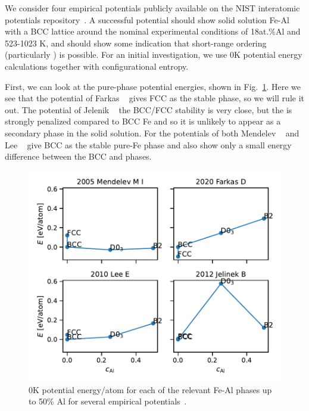 We consider four empirical potentials \cite{mendelev2005effect, lee2010modified, jelinek2012modified, farkas2020model} publicly available on the NIST interatomic potentials repository~\cite{nist}.
A successful potential should show solid solution Fe-Al with a BCC lattice around the nominal experimental conditions of 18at.\%Al and 523-1023 K, and should show some indication that short-range ordering (particularly \DOTHREE) is possible.
For an initial investigation, we use 0K potential energy calculations together with configurational entropy.

First, we can look at the pure-phase potential energies, shown in Fig.~\ref{fig:0K_phases}.
Here we see that the potential of Farkas \etal~\cite{farkas2020model} gives FCC as the stable phase, so we will rule it out.
The potential of Jelenik \etal~\cite{jelinek2012modified} the BCC/FCC stability is very close, but the \DOTHREE is strongly penalized compared to BCC Fe and so it is unlikely to appear as a secondary phase in the solid solution.
For the potentials of both Mendelev \etal~\cite{mendelev2005effect} and Lee \etal~\cite{lee2010modified} give BCC as the stable pure-Fe phase and also show only a small energy difference between the BCC and \DOTHREE phases.
%
\begin{figure}[h]
    \centering
    \includegraphics[width=\textwidth]{figures/zerok_phases}
    \caption{0K potential energy/atom for each of the relevant Fe-Al phases up to 50\% Al for several empirical potentials~\cite{mendelev2005effect, lee2010modified, jelinek2012modified, farkas2020model}.}
    \label{fig:0K_phases}
\end{figure}
%

